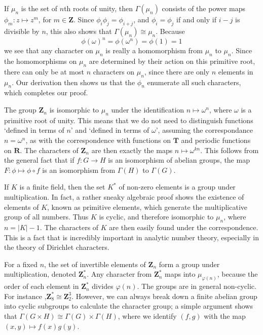 \begin{example}
    If $\mu_n$ is the set of $n$th roots of unity, then $\Gamma(\mu_n)$ consists of the power maps $\phi_m: z \mapsto z^m$, for $m \in \mathbf{Z}$. Since $\phi_i \phi_j = \phi_{i+j}$, and $\phi_i = \phi_j$ if and only if $i - j$ is divisible by $n$, this also shows that $\Gamma(\mu_n) \cong \mu_n$. Because
    \[ \phi(\omega)^n = \phi(\omega^n) = \phi(1) = 1 \]
    we see that any character on $\mu_n$ is really a homomorphism from $\mu_n$ to $\mu_n$. Since the homomorphisms on $\mu_n$ are determined by their action on this primitive root, there can only be at most $n$ characters on $\mu_n$, since there are only $n$ elements in $\mu_n$. Our derivation then shows us that the $\phi_n$ enumerate all such characters, which completes our proof.
\end{example}

\begin{example}
    The group $\mathbf{Z}_n$ is isomorphic to $\mu_n$ under the identification $n \mapsto \omega^n$, where $\omega$ is a primitive root of unity. This means that we do not need to distinguish functions `defined in terms of $n$' and `defined in terms of $\omega$', assuming the correspondance $n = \omega^n$, as with the correspondence with functions on $\mathbf{T}$ and periodic functions on $\mathbf{R}$. The characters of $\mathbf{Z}_n$ are then exactly the maps $n \mapsto \omega^{kn}$. This follows from the general fact that if $f: G \to H$ is an isomorphism of abelian groups, the map $F: \phi \mapsto \phi \circ f$ is an isomorphism from $\Gamma(H)$ to $\Gamma(G)$.
\end{example}

\begin{example}
    If $K$ is a finite field, then the set $K^*$ of non-zero elements is a group under multiplication. In fact, a rather sneaky algebraic proof shows the existence of elements of $K$, known as primitive elements, which generate the multiplicative group of all numbers. Thus $K$ is cyclic, and therefore isomorphic to $\mu_n$, where $n = |K| - 1$. The characters of $K$ are then easily found under the correspondence. This is a fact that is incredibly important in analytic number theory, especially in the theory of Dirichlet characters.
\end{example}

\begin{example}
    For a fixed $n$, the set of invertible elements of $\mathbf{Z}_n$ form a group under multiplication, denoted $\mathbf{Z}_n^*$. Any character from $\mathbf{Z}_n^*$ maps into $\mu_{\varphi(n)}$, because the order of each element in $\mathbf{Z}_n^*$ divides $\varphi(n)$. The groups are in general non-cyclic. For instance ,$\mathbf{Z}_8^* \cong \mathbf{Z}_2^3$. However, we can always break down a finite abelian group into cyclic subgroups to calculate the character group; a simple argument shows that $\Gamma(G \times H) \cong \Gamma(G) \times \Gamma(H)$, where we identify $(f,g)$ with the map $(x,y) \mapsto f(x)g(y)$.
\end{example}

